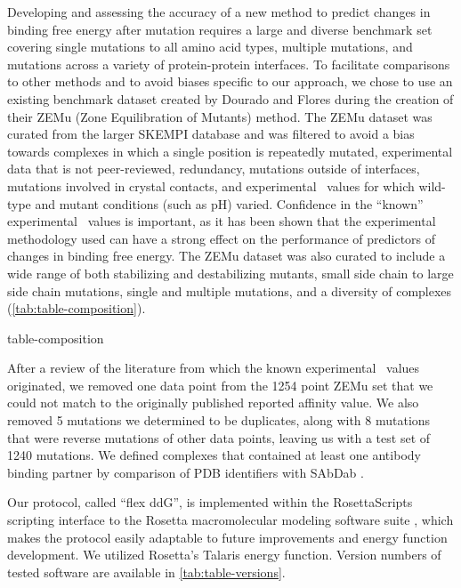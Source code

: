 Developing and assessing the accuracy of a new method to predict changes in binding free energy after mutation requires a large and diverse benchmark set covering single mutations to all amino acid types, multiple mutations, and mutations across a variety of protein-protein interfaces.
To facilitate comparisons to other methods and to avoid biases specific to our approach, we chose to use an existing benchmark dataset created by Dourado and Flores\cite{dourado_multiscale_2014} during the creation of their ZEMu (Zone Equilibration of Mutants) method.
The ZEMu dataset was curated from the larger SKEMPI database\cite{moal_skempi:_2012} and was filtered to avoid a bias towards complexes in which a single position is repeatedly mutated, experimental data that is not peer-reviewed, redundancy, mutations outside of interfaces, mutations involved in crystal contacts, and experimental \ddg\ values for which wild-type and mutant conditions (such as pH) varied.
Confidence in the ``known'' experimental \ddg\ values is important, as it has been shown that the experimental methodology used can have a strong effect on the performance of predictors of changes in binding free energy\cite{geng_exploring_2016}.
The ZEMu dataset was also curated to include a wide range of both stabilizing and destabilizing mutants, small side chain to large side chain mutations, single and multiple mutations, and a diversity of complexes (\cref{tab:table-composition}).

{table-composition}

After a review of the literature from which the known experimental \ddg\ values originated, we removed one data point from the 1254 point ZEMu set that we could not match to the originally published reported affinity value. We also removed 5 mutations we determined to be duplicates, along with 8 mutations that were reverse mutations of other data points, leaving us with a test set of 1240 mutations.
We defined complexes that contained at least one antibody binding partner by comparison of PDB identifiers with SAbDab \cite{dunbar_sabdab:_2014}.

Our protocol, called ``flex ddG'', is implemented within the RosettaScripts scripting interface to the Rosetta macromolecular modeling software suite \cite{fleishman_rosettascripts:_2011}, which makes the protocol easily adaptable to future improvements and energy function development. We utilized Rosetta's Talaris \cite{leaver-fay_chapter_2013,song_structure-guided_2011,shapovalov_smoothed_2011} energy function.
Version numbers of tested software are available in \cref{tab:table-versions}.


